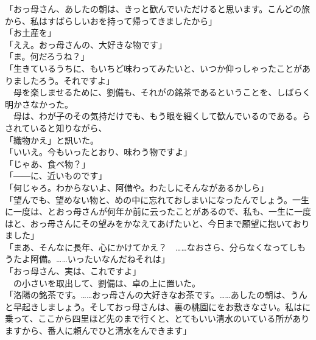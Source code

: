 \documentclass[
  paper=a5,
  fontsize=10pt,
  jafontsize=9.5pt,
  tate,                  %
  open_bracket_pos=nibu, %
]{jlreq}
\begin{document}
「おっ母さん、あしたの朝は、きっと歓んでいただけると思います。こんどの旅から、私はすばらしいおを持って帰ってきましたから」\\


「お土産を」\\


「ええ。おっ母さんの、大好きな物です」\\


「ま。何だろうね？」\\


「生きているうちに、もいちど味わってみたいと、いつか仰っしゃったことがありましたろう。それですよ」\\


　母を楽しませるために、劉備も、それがの銘茶であるということを、しばらく明かさなかった。\\


　母は、わが子のその気持だけでも、もう眼を細くして歓んでいるのである。らされていると知りながら、\\


「織物かえ」と訊いた。\\


「いいえ。今もいったとおり、味わう物ですよ」\\


「じゃあ、食べ物？」\\


「――に、近いものです」\\


「何じゃろ。わからないよ、阿備や。わたしにそんながあるかしら」\\


「望んでも、望めない物と、めの中に忘れておしまいになったんでしょう。一生に一度は、とおっ母さんが何年か前に云ったことがあるので、私も、一生に一度はと、おっ母さんにその望みをかなえてあげたいと、今日まで願望に抱いておりました」\\


「まあ、そんなに長年、心にかけてかえ？　……なおさら、分らなくなってしもうたよ阿備。……いったいなんだねそれは」\\


「おっ母さん、実は、これですよ」\\


　の小さいを取出して、劉備は、卓の上に置いた。\\


「洛陽の銘茶です。……おっ母さんの大好きなお茶です。……あしたの朝は、うんと早起きしましょう。そしておっ母さんは、裏の桃園にをお敷きなさい。私はに乗って、ここから四里ほど先のまで行くと、とてもいい清水のいている所がありますから、番人に頼んでひと清水をんできます」\\
\end{document}
